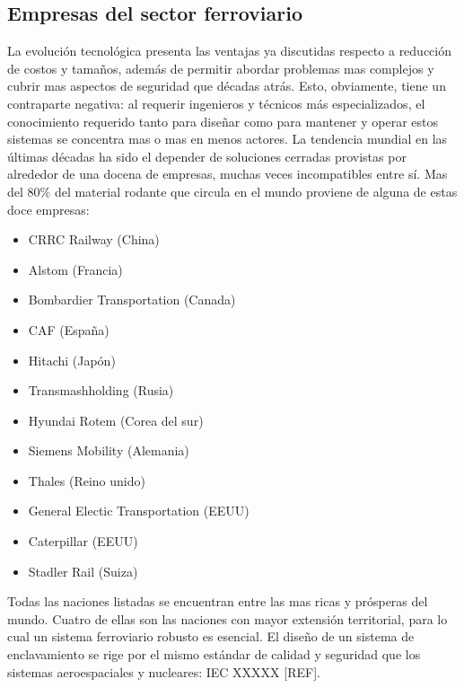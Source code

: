 \subsection{Empresas del sector ferroviario}

    La evolución tecnológica presenta las ventajas ya discutidas respecto a reducción de costos y tamaños, además de permitir abordar problemas mas complejos y cubrir mas aspectos de seguridad que décadas atrás. Esto, obviamente, tiene un contraparte negativa: al requerir ingenieros y técnicos más especializados, el conocimiento requerido tanto para diseñar como para mantener y operar estos sistemas se concentra mas o mas en menos actores. La tendencia mundial en las últimas décadas ha sido el depender de soluciones cerradas provistas por alrededor de una docena de empresas, muchas veces incompatibles entre sí. Mas del 80\% del material rodante que circula en el mundo proviene de alguna de estas doce empresas:

    \begin{itemize}
        \item CRRC Railway (China)
        \item Alstom (Francia)
        \item Bombardier Transportation (Canada)
        \item CAF (España)
        \item Hitachi (Japón)
        \item Transmashholding (Rusia)
        \item Hyundai Rotem (Corea del sur)
        \item Siemens Mobility (Alemania)
        \item Thales (Reino unido)
        \item General Electic Transportation (EEUU)
        \item Caterpillar (EEUU)
        \item Stadler Rail (Suiza)
    \end{itemize}
    
    Todas las naciones listadas se encuentran entre las mas ricas y prósperas del mundo. Cuatro de ellas son las naciones con mayor extensión territorial, para lo cual un sistema ferroviario robusto es esencial. El diseño de un sistema de enclavamiento se rige por el mismo estándar de calidad y seguridad que los sistemas aeroespaciales y nucleares: IEC XXXXX [REF].

    